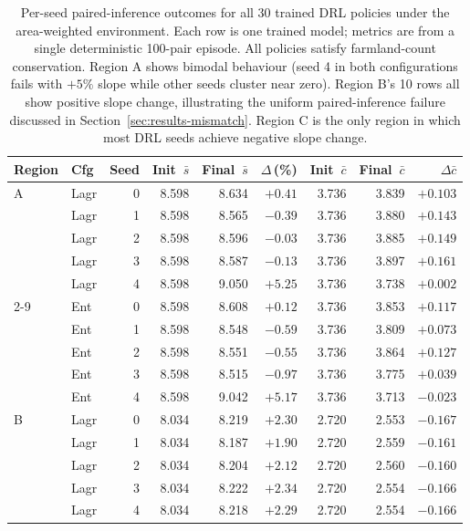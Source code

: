 \documentclass[]{interact}
\theoremstyle{plain}
\begin{document}
\begin{table}[!ht]
\centering
\caption{Per-seed paired-inference outcomes for all 30 trained DRL policies under the area-weighted environment. Each row is one trained model; metrics are from a single deterministic 100-pair episode. All policies satisfy farmland-count conservation. Region A shows bimodal behaviour (seed 4 in both configurations fails with $+5\%$ slope while other seeds cluster near zero). Region B's 10 rows all show positive slope change, illustrating the uniform paired-inference failure discussed in Section~\ref{sec:results-mismatch}. Region C is the only region in which most DRL seeds achieve negative slope change.}
\label{tab:per-seed}
\begin{tabular}{llrrrrrrr}
\toprule
Region & Cfg & Seed & Init~$\bar{s}$ & Final~$\bar{s}$ & $\Delta$\,(\%) & Init~$\bar{c}$ & Final~$\bar{c}$ & $\Delta\bar{c}$ \\
\midrule
A  & Lagr & 0 & 8.598 & 8.634 & $+0.41$ & 3.736 & 3.839 & $+0.103$ \\
   & Lagr & 1 & 8.598 & 8.565 & $-0.39$ & 3.736 & 3.880 & $+0.143$ \\
   & Lagr & 2 & 8.598 & 8.596 & $-0.03$ & 3.736 & 3.885 & $+0.149$ \\
   & Lagr & 3 & 8.598 & 8.587 & $-0.13$ & 3.736 & 3.897 & $+0.161$ \\
   & Lagr & 4 & 8.598 & 9.050 & $+5.25$ & 3.736 & 3.738 & $+0.002$ \\
\cmidrule{2-9}
   & Ent  & 0 & 8.598 & 8.608 & $+0.12$ & 3.736 & 3.853 & $+0.117$ \\
   & Ent  & 1 & 8.598 & 8.548 & $-0.59$ & 3.736 & 3.809 & $+0.073$ \\
   & Ent  & 2 & 8.598 & 8.551 & $-0.55$ & 3.736 & 3.864 & $+0.127$ \\
   & Ent  & 3 & 8.598 & 8.515 & $-0.97$ & 3.736 & 3.775 & $+0.039$ \\
   & Ent  & 4 & 8.598 & 9.042 & $+5.17$ & 3.736 & 3.713 & $-0.023$ \\
\midrule
B  & Lagr & 0 & 8.034 & 8.219 & $+2.30$ & 2.720 & 2.553 & $-0.167$ \\
   & Lagr & 1 & 8.034 & 8.187 & $+1.90$ & 2.720 & 2.559 & $-0.161$ \\
   & Lagr & 2 & 8.034 & 8.204 & $+2.12$ & 2.720 & 2.560 & $-0.160$ \\
   & Lagr & 3 & 8.034 & 8.222 & $+2.34$ & 2.720 & 2.554 & $-0.166$ \\
   & Lagr & 4 & 8.034 & 8.218 & $+2.29$ & 2.720 & 2.554 & $-0.166$ \\

\end{tabular}
\end{table}
\end{document}
